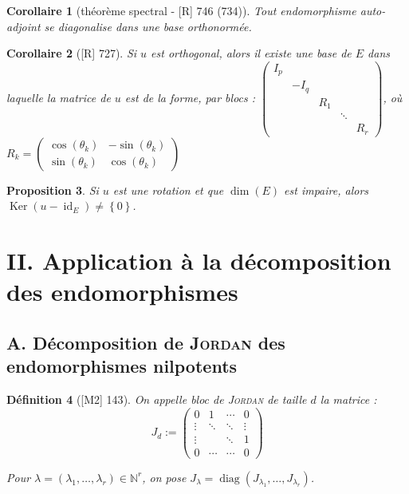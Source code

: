 \documentclass[10pt, a4paper, parskip=full, twoside, twocolumn]{report}
\newtheorem{definition}{Définition}
\newtheorem{proposition}[definition]{Proposition}
\newtheorem{corollary}[definition]{Corollaire}
\newcommand{\IN}{\mathbb{N}}
\DeclareMathOperator{\Ker}{Ker}
\DeclareMathOperator{\id}{id}
\DeclareMathOperator{\diag}{diag}
\begin{document}
\begin{corollary}[théorème spectral - \textnormal{[R] 746 (734)}]
	Tout endomorphisme auto-adjoint se diagonalise dans une base orthonormée.
\end{corollary}

\begin{corollary}[\textnormal{[R] 727}]
	Si $u$ est orthogonal, alors il existe une base de $E$ dans laquelle la matrice de $u$ est de la forme, par blocs :
	$\begin{pmatrix}
		I_p & & & & \\
		& -I_q & & & \\
		& & R_1 & & \\
		& & & \ddots & \\
		& & & & R_r
	\end{pmatrix}$, où $R_k = \begin{pmatrix}
		\cos(\theta_k) & -\sin(\theta_k) \\ \sin(\theta_k) & \cos(\theta_k)
	\end{pmatrix}$
\end{corollary}

\begin{proposition}
	Si $u$ est une rotation et que $\dim (E)$ est impaire, alors $\Ker(u-\id_E)\neq \left\{0\right\}$.
\end{proposition}

\section*{II. Application à la décomposition des endomorphismes}
\subsection*{A. Décomposition de \textsc{Jordan} des endomorphismes nilpotents}

\begin{definition}[\textnormal{[M2] 143}]
	On appelle \emph{bloc de \textsc{Jordan}} de taille $d$ la matrice :
	$$J_d := \begin{pmatrix}
		0 & 1 & \cdots & 0 \\
		\vdots & \ddots & \ddots & \vdots \\
		\vdots & & \ddots & 1 \\
		0 & \cdots & \cdots & 0
	\end{pmatrix}$$

	Pour $\lambda = (\lambda_1, \dots, \lambda_r)\in\IN^r$, on pose $J_{\lambda} = \diag(J_{\lambda_1},\dots, J_{\lambda_r})$.
\end{definition}
\end{document}
